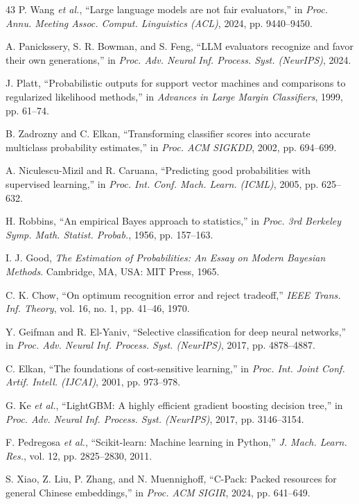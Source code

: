 \begin{thebibliography}{43}
 P. Wang \emph{et al.}, ``Large language models are not fair evaluators,'' in \emph{Proc. Annu. Meeting Assoc. Comput. Linguistics (ACL)}, 2024, pp. 9440--9450.

 A. Panickssery, S. R. Bowman, and S. Feng, ``LLM evaluators recognize and favor their own generations,'' in \emph{Proc. Adv. Neural Inf. Process. Syst. (NeurIPS)}, 2024.

 J. Platt, ``Probabilistic outputs for support vector machines and comparisons to regularized likelihood methods,'' in \emph{Advances in Large Margin Classifiers}, 1999, pp. 61--74.

 B. Zadrozny and C. Elkan, ``Transforming classifier scores into accurate multiclass probability estimates,'' in \emph{Proc. ACM SIGKDD}, 2002, pp. 694--699.

 A. Niculescu-Mizil and R. Caruana, ``Predicting good probabilities with supervised learning,'' in \emph{Proc. Int. Conf. Mach. Learn. (ICML)}, 2005, pp. 625--632.

 H. Robbins, ``An empirical Bayes approach to statistics,'' in \emph{Proc. 3rd Berkeley Symp. Math. Statist. Probab.}, 1956, pp. 157--163.

 I. J. Good, \emph{The Estimation of Probabilities: An Essay on Modern Bayesian Methods}. Cambridge, MA, USA: MIT Press, 1965.

 C. K. Chow, ``On optimum recognition error and reject tradeoff,'' \emph{IEEE Trans. Inf. Theory}, vol. 16, no. 1, pp. 41--46, 1970.

 Y. Geifman and R. El-Yaniv, ``Selective classification for deep neural networks,'' in \emph{Proc. Adv. Neural Inf. Process. Syst. (NeurIPS)}, 2017, pp. 4878--4887.

 C. Elkan, ``The foundations of cost-sensitive learning,'' in \emph{Proc. Int. Joint Conf. Artif. Intell. (IJCAI)}, 2001, pp. 973--978.

 G. Ke \emph{et al.}, ``LightGBM: A highly efficient gradient boosting decision tree,'' in \emph{Proc. Adv. Neural Inf. Process. Syst. (NeurIPS)}, 2017, pp. 3146--3154.

 F. Pedregosa \emph{et al.}, ``Scikit-learn: Machine learning in Python,'' \emph{J. Mach. Learn. Res.}, vol. 12, pp. 2825--2830, 2011.

 S. Xiao, Z. Liu, P. Zhang, and N. Muennighoff, ``C-Pack: Packed resources for general Chinese embeddings,'' in \emph{Proc. ACM SIGIR}, 2024, pp. 641--649.


\end{thebibliography}

